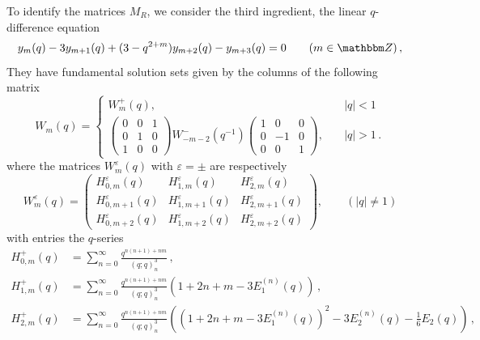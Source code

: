 \documentclass[12pt,reqno]{amsart}
\theoremstyle{definition}
\def\BZ{\mathbbm Z}
\def\v{\varepsilon}
\def\diag{\mathrm{diag}}
\begin{document}
To identify the matrices $M_R$, we consider the third ingredient,
the linear $q$-difference equation 
\begin{equation}
  \label{52qdiffp}
  y_{m}(q) -3y_{m+1}(q)+(3-q^{2+m}) y_{m+2}(q) - y_{m+3}(q)=0 \qquad (m \in \BZ) \,,
\end{equation}
They have fundamental solution sets given by the columns of the
following matrix 
\begin{equation}
  W_m(q) =
  \begin{cases}
    W_m^+(q), & \quad |q|<1\\
    \begin{pmatrix}
      0&0&1\\0&1&0\\1&0&0
    \end{pmatrix}
    W_{-m-2}^-(q^{-1})
    \begin{pmatrix}
      1&0&0\\0&-1&0\\0&0&1
    \end{pmatrix}
    , & \quad |q| >1 \,.
  \end{cases}
\end{equation}
where the matrices $W^\v_m(q)$ with $\v=\pm$ are respectively
\begin{equation}
  \label{Hfund}
  W^{\v}_m(q) =
  \begin{pmatrix}
    H^\v_{0,m}(q) & H^\v_{1,m}(q) & H^\v_{2,m}(q) \\
    H^\v_{0,m+1}(q) & H^\v_{1,m+1}(q) & H^\v_{2,m+1}(q) \\
    H^\v_{0,m+2}(q) & H^\v_{1,m+2}(q) & H^\v_{2,m+2}(q) 
  \end{pmatrix}, \qquad (|q| \neq 1)
\end{equation}
with entries the $q$-series
\begin{subequations}
\begin{align}
\label{Hp0m}
  H^+_{0,m}(q)
  &=\sum_{n=0}^\infty \frac{q^{n(n+1)+nm}}{(q;q)_n^3}\,,
\\
\label{Hp1m}
  H^+_{1,m}(q)
  &=\sum_{n=0}^\infty \frac{q^{n(n+1)+nm}}{(q;q)_n^3}
    \left(1+2n+m-3E_1^{(n)}(q)\right) \,,
  \\
  \label{Hp2m}
  H^+_{2,m}(q)
  &=\sum_{n=0}^\infty \frac{q^{n(n+1)+nm}}{(q;q)_n^3}
    \left((1+2n+m-3E_1^{(n)}(q))^2-3E_2^{(n)}(q)-\frac{1}{6}E_2(q)\right) \,,
\end{align}
\end{subequations}
\end{document}
